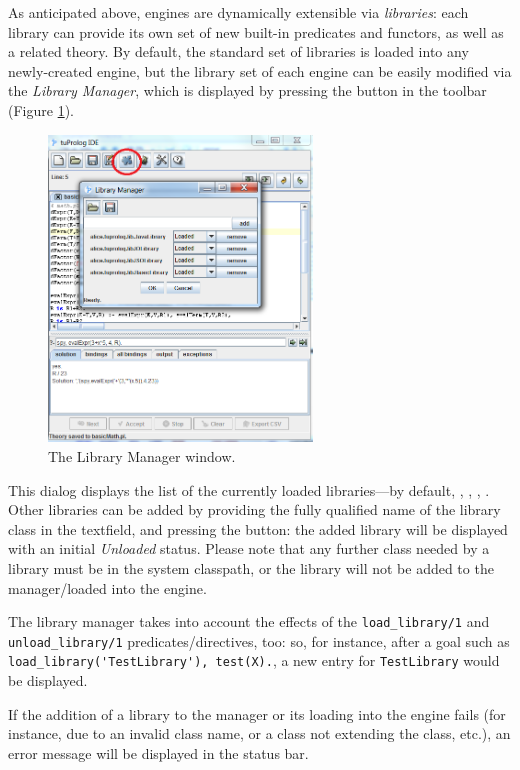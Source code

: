 As anticipated above, \tuprolog{} engines are dynamically extensible via \textit{libraries}: each library can provide its own set of new built-in
predicates and functors, as well as a related theory. 
%
By default, the standard set of libraries is loaded into any newly-created engine, but the library set of each engine can be easily modified via the \textit{Library Manager}, which is displayed by pressing the  button in the toolbar (Figure \ref{fig:gui-library-manager}).

\begin{figure}
\centering
\includegraphics[width=7cm]{images/gui-library-manager}
\caption{The Library Manager window.}
\label{fig:gui-library-manager}
\end{figure}

This dialog displays the list of the currently loaded libraries---by default,
, , , . 
%
Other libraries can be added by providing the fully qualified name of the
library class in the textfield, and pressing the  button: the added library will be displayed with an initial \textit{Unloaded} status. 
%
Please note that any further class needed by a library must be in the system classpath, or the library will not be added to the manager/loaded into the engine.

The library manager takes into account the effects of the \verb|load_library/1| and \verb|unload_library/1| predicates/directives, too: so, for instance, after a goal such as \verb|load_library('TestLibrary'), test(X).|, a new entry for \verb|TestLibrary| would be displayed.

If the addition of a library to the manager or its loading into the engine fails (for instance, due to an invalid class name, or a class not extending the
 class, etc.), an error message will be displayed
in the status bar.  

